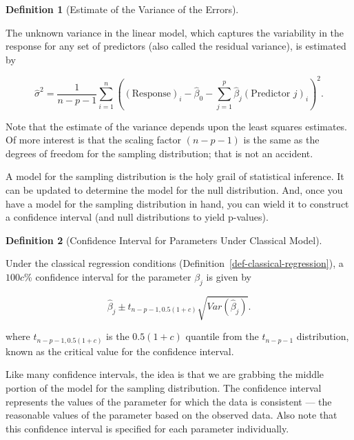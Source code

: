 \documentclass[
  letterpaper,
  DIV=11,
  numbers=noendperiod]{scrreprt}
\theoremstyle{definition}
\theoremstyle{definition}
\newtheorem{definition}{Definition}[chapter]
\theoremstyle{remark}
\begin{document}
\begin{definition}[Estimate of the Variance of the
Errors]\protect\hypertarget{def-estimate-sigma2}{}\label{def-estimate-sigma2}

The unknown variance in the linear model, which captures the variability
in the response for any set of predictors (also called the residual
variance), is estimated by

\[\widehat{\sigma}^2 = \frac{1}{n-p-1} \sum\limits_{i=1}^{n} \left((\text{Response})_i - \widehat{\beta}_0 - \sum\limits_{j=1}^{p} \widehat{\beta}_j (\text{Predictor } j)_{i}\right)^2.\]

\end{definition}

Note that the estimate of the variance depends upon the least squares
estimates. Of more interest is that the scaling factor \((n - p - 1)\)
is the same as the degrees of freedom for the sampling distribution;
that is not an accident.

A model for the sampling distribution is the holy grail of statistical
inference. It can be updated to determine the model for the null
distribution. And, once you have a model for the sampling distribution
in hand, you can wield it to construct a confidence interval (and null
distributions to yield p-values).

\begin{definition}[Confidence Interval for Parameters Under Classical
Model]\protect\hypertarget{def-classical-ci}{}\label{def-classical-ci}

Under the classical regression conditions
(Definition~\ref{def-classical-regression}), a \(100c\)\% confidence
interval for the parameter \(\beta_j\) is given by

\[\widehat{\beta}_j \pm t_{n-p-1, 0.5(1+c)} \sqrt{Var\left(\widehat{\beta}_j\right)}.\]

where \(t_{n-p-1, 0.5(1+c)}\) is the \(0.5(1+c)\) quantile from the
\(t_{n-p-1}\) distribution, known as the critical value for the
confidence interval.

\end{definition}

Like many confidence intervals, the idea is that we are grabbing the
middle portion of the model for the sampling distribution. The
confidence interval represents the values of the parameter for which the
data is consistent --- the reasonable values of the parameter based on
the observed data. Also note that this confidence interval is specified
for each parameter individually.
\end{document}

